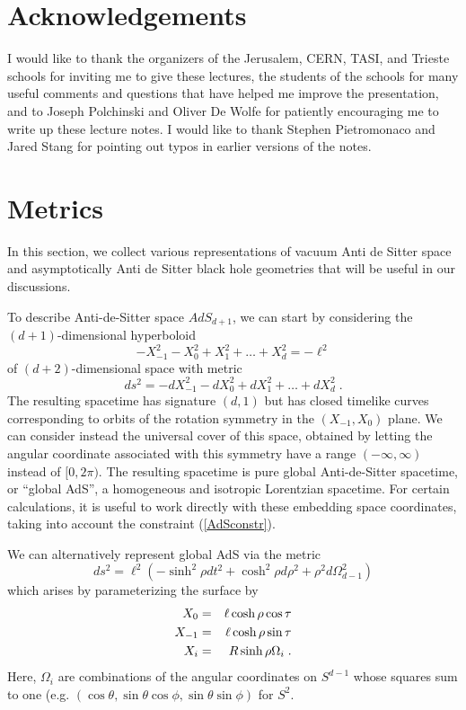 \documentclass[12pt,epsf]{article}
\newcommand{\be}{\begin{equation}}
\newcommand{\ee}{\end{equation}}
\newcommand{\bea}{\begin{eqnarray}}
\newcommand{\eea}{\end{eqnarray}}
\begin{document}
\section*{Acknowledgements}

I would like to thank the organizers of the Jerusalem, CERN, TASI, and Trieste schools for inviting me to give these lectures, the students of the schools for many useful comments and questions that have helped me improve the presentation, and to Joseph Polchinski and Oliver De Wolfe for patiently encouraging me to write up these lecture notes. I would like to thank Stephen Pietromonaco and Jared Stang for pointing out typos in earlier versions of the notes.

\appendix

\section{Metrics}

In this section, we collect various representations of vacuum Anti de Sitter space and asymptotically Anti de Sitter black hole geometries that will be useful in our discussions.

To describe Anti-de-Sitter space $AdS_{d+1}$, we can start by considering the $(d+1)$-dimensional hyperboloid
\be
\label{AdSconstr}
-X_{-1}^2  - X_{0}^2 + X_{1}^2+ \dots + X_{d}^2 = -\ell^2
\ee
of $(d+2)$-dimensional space with metric
\be
ds^2 = -dX_{-1}^2  - dX_{0}^2 + dX_{1}^2+ \dots + dX_{d}^2 \; .
\ee
The resulting spacetime has signature $(d,1)$ but has closed timelike curves corresponding to orbits of the rotation symmetry in the $(X_{-1},X_0)$ plane. We can consider instead the universal cover of this space, obtained by letting the angular coordinate associated with this symmetry have a range $(-\infty,\infty)$ instead of $[0,2 \pi)$. The resulting spacetime is pure global Anti-de-Sitter spacetime, or ``global AdS'', a homogeneous and isotropic Lorentzian spacetime. For certain calculations, it is useful to work directly with these embedding space coordinates, taking into account the constraint (\ref{AdSconstr}).

We can alternatively represent global AdS via the metric
\be
\label{globalAdS}
ds^2 = \ell^2 (-\sinh^2 \rho dt^2 + \cosh^2 \rho d \rho^2 + \rho^2 d \Omega_{d-1}^2)
\ee
which arises by parameterizing the surface by
\bea
X_0 &=& \ell \cosh \rho \cos \tau \cr
X_{-1} &=& \ell \cosh \rho \sin \tau \cr
X_i &=& R \sinh \rho \Omega_i \; .
\eea
Here, $\Omega_i$ are combinations of the angular coordinates on $S^{d-1}$ whose squares sum to one (e.g. $(\cos\theta,\sin\theta \cos\phi,\sin\theta \sin \phi)$ for $S^2$.
\end{document}
